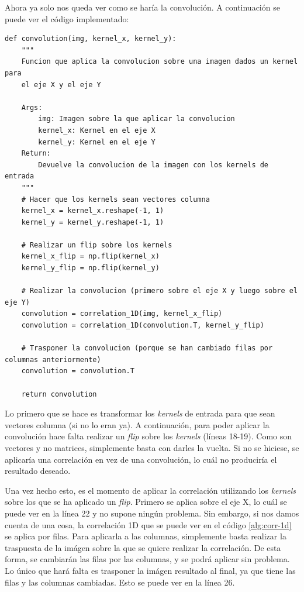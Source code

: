 \documentclass[11pt,a4paper]{article}
\begin{document}
Ahora ya solo nos queda ver como se haría la convolución. A continuación se puede ver el código implementado:

\begin{lstlisting}[caption={Función que aplica la convolución 2D sobre una imágen.},label={alg:convolution}]
def convolution(img, kernel_x, kernel_y):
    """
    Funcion que aplica la convolucion sobre una imagen dados un kernel para
    el eje X y el eje Y
    
    Args:
        img: Imagen sobre la que aplicar la convolucion
        kernel_x: Kernel en el eje X
        kernel_y: Kernel en el eje Y
    Return:
        Devuelve la convolucion de la imagen con los kernels de entrada
    """
    # Hacer que los kernels sean vectores columna
    kernel_x = kernel_x.reshape(-1, 1)
    kernel_y = kernel_y.reshape(-1, 1)
    
    # Realizar un flip sobre los kernels
    kernel_x_flip = np.flip(kernel_x)
    kernel_y_flip = np.flip(kernel_y)

    # Realizar la convolucion (primero sobre el eje X y luego sobre el eje Y)
    convolution = correlation_1D(img, kernel_x_flip)
    convolution = correlation_1D(convolution.T, kernel_y_flip)

    # Trasponer la convolucion (porque se han cambiado filas por columnas anteriormente)
    convolution = convolution.T

    return convolution
\end{lstlisting}

Lo primero que se hace es transformar los \textit{kernels} de entrada para que sean vectores columna (si no lo eran ya). A
continuación, para poder aplicar la convolución hace falta realizar un \textit{flip} sobre los \textit{kernels} (líneas 18-19).
Como son vectores y no matrices, simplemente basta con darles la vuelta. Si no se hiciese, se aplicaría una correlación en vez de
una convolución, lo cuál no produciría el resultado deseado.

Una vez hecho esto, es el momento de aplicar la correlación utilizando los \textit{kernels} sobre los que se ha aplicado un
\textit{flip}. Primero se aplica sobre el eje X, lo cuál se puede ver en la línea 22 y no supone ningún problema. Sin embargo,
si nos damos cuenta de una cosa, la correlación 1D que se puede ver en el código \ref{alg:corr-1d} se aplica por filas. Para
aplicarla a las columnas, simplemente basta realizar la traspuesta de la imágen sobre la que se quiere realizar la correlación.
De esta forma, se cambiarán las filas por las columnas, y se podrá aplicar sin problema. Lo único que hará falta es trasponer
la imágen resultado al final, ya que tiene las filas y las columnas cambiadas. Esto se puede ver en la línea 26.
\end{document}
